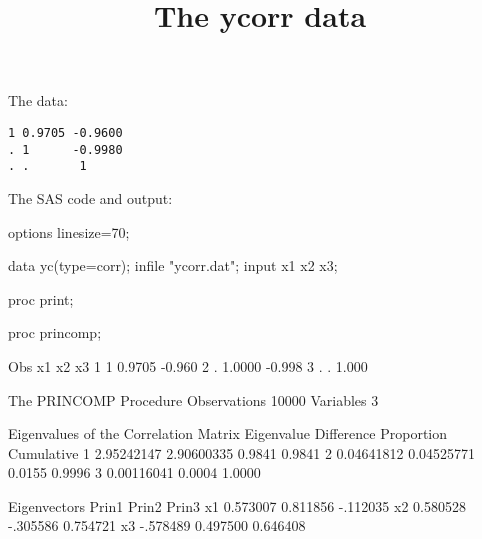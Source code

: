 \documentclass{article}
\title{The ycorr data}
\begin{document}
\maketitle
The data:
\begin{verbatim}
1 0.9705 -0.9600
. 1      -0.9980
. .       1
\end{verbatim}
The SAS code and output:
\begin{Winput}
options linesize=70;

data yc(type=corr);
  infile "ycorr.dat";
  input x1 x2 x3;

proc print;

proc princomp;

\end{Winput}
\begin{Woutput}
Obs    x1      x2        x3
 1      1    0.9705    -0.960
 2      .    1.0000    -0.998
 3      .     .         1.000

The PRINCOMP Procedure
Observations       10000
Variables              3

            Eigenvalues of the Correlation Matrix
        Eigenvalue    Difference    Proportion    Cumulative
   1    2.95242147    2.90600335        0.9841        0.9841
   2    0.04641812    0.04525771        0.0155        0.9996
   3    0.00116041                      0.0004        1.0000

                Eigenvectors
           Prin1         Prin2         Prin3
x1      0.573007      0.811856      -.112035
x2      0.580528      -.305586      0.754721
x3      -.578489      0.497500      0.646408
\end{Woutput}
\end{document}
